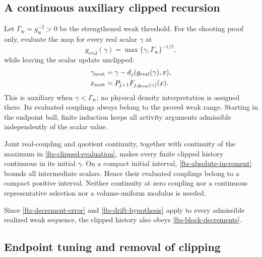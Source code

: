 \subsection{A continuous auxiliary clipped recursion}
\label{fts-clipping-section}

Let $\Gamma_{\mathrm w}=g_{\mathrm w}^{-2}>0$ be the
strengthened weak threshold. For the shooting proof only,
evaluate the map for every real scalar $\gamma$ at
\begin{equation}
 g_{\mathrm{eval}}(\gamma)
       =\max\{\gamma,\Gamma_{\mathrm w}\}^{-1/2},
 \label{fts-clipped-evaluation}
\end{equation}
while leaving the scalar update unclipped:
\begin{align}
 \gamma_{\mathrm{next}}
       &=\gamma-d_j(g_{\mathrm{eval}}(\gamma),x),\notag\\
 x_{\mathrm{next}}
       &=P_{j+1}F_{j,g_{\mathrm{eval}}(\gamma)}(x).
 \label{fts-clipped-update}
\end{align}
This is auxiliary when $\gamma<\Gamma_{\mathrm w}$; no
physical density interpretation is assigned there.
Its evaluated couplings always belong to the proved weak
range. Starting in the endpoint ball, finite induction
keeps all activity arguments admissible independently
of the scalar value.

Joint real-coupling and quotient continuity, together with
continuity of the maximum in
\eqref{fts-clipped-evaluation}, makes every finite clipped
history continuous in its initial $\gamma$. On a compact
initial interval, \eqref{fts-absolute-increment} bounds all
intermediate scalars. Hence their evaluated couplings
belong to a compact positive interval. Neither continuity
at zero coupling nor a continuous representative selection
nor a volume-uniform modulus is needed.

Since \eqref{fts-decrement-error} and
\eqref{fts-drift-hypothesis} apply to every admissible
realized weak sequence, the clipped history also obeys
\eqref{fts-block-decrements}.

\subsection{Endpoint tuning and removal of clipping}
\label{fts-tuning-section}

